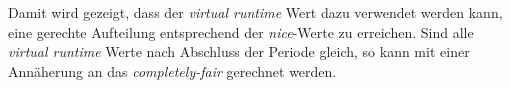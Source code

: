 Damit wird gezeigt, dass der \textit{virtual runtime} Wert dazu verwendet werden kann, eine gerechte Aufteilung entsprechend der \textit{nice}-Werte zu erreichen. 
Sind alle \textit{virtual runtime} Werte nach Abschluss der Periode gleich, so kann mit einer Annäherung an das \textit{completely-fair} gerechnet werden.








